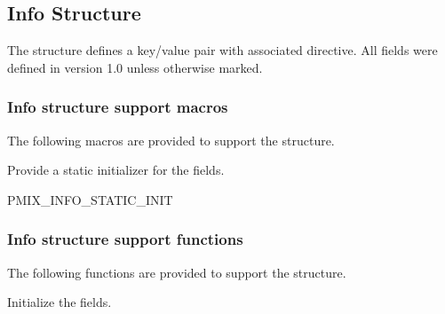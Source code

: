 \subsection{Info Structure}
\label{chap:struct:info}

The  structure defines a key/value pair with associated directive. All fields were defined in version 1.0 unless otherwise marked.


\subsubsection{Info structure support macros}
The following macros are provided to support the  structure.


Provide a static initializer for the  fields.

\cspecificstart
\begin{codepar}
PMIX_INFO_STATIC_INIT
\end{codepar}
\cspecificend


\subsubsection{Info structure support functions}
The following functions are provided to support the  structure.


Initialize the  fields.


